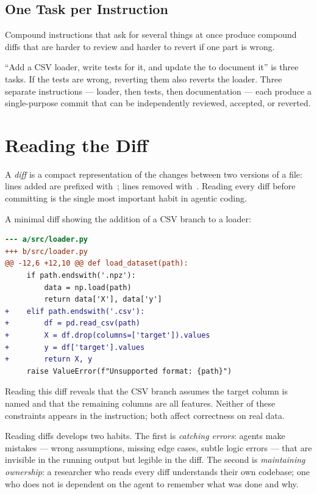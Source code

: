 \subsection{One Task per Instruction}

Compound instructions that ask for several things at once produce compound diffs that are harder to review and harder to revert if one part is wrong.

\begin{remark}
``Add a CSV loader, write tests for it, and update the  to document it'' is three tasks.
If the tests are wrong, reverting them also reverts the loader.
Three separate instructions — loader, then tests, then documentation — each produce a single-purpose commit that can be independently reviewed, accepted, or reverted.
\end{remark}

\section{Reading the Diff}
\label{section:ReadingDiff}

A \emph{diff} is a compact representation of the changes between two versions of a file: lines added are prefixed with~\code{+}; lines removed with~\code{-}.
Reading every diff before committing is the single most important habit in agentic coding.

\begin{example}
A minimal diff showing the addition of a CSV branch to a loader:
\begin{lstlisting}[language=diff]
--- a/src/loader.py
+++ b/src/loader.py
@@ -12,6 +12,10 @@ def load_dataset(path):
     if path.endswith('.npz'):
         data = np.load(path)
         return data['X'], data['y']
+    elif path.endswith('.csv'):
+        df = pd.read_csv(path)
+        X = df.drop(columns=['target']).values
+        y = df['target'].values
+        return X, y
     raise ValueError(f"Unsupported format: {path}")
\end{lstlisting}
Reading this diff reveals that the CSV branch assumes the target column is named  and that the remaining columns are all features.
Neither of these constraints appears in the instruction; both affect correctness on real data.
\end{example}

Reading diffs develops two habits.
The first is \emph{catching errors}: agents make mistakes — wrong assumptions, missing edge cases, subtle logic errors — that are invisible in the running output but legible in the diff.
The second is \emph{maintaining ownership}: a researcher who reads every diff understands their own codebase; one who does not is dependent on the agent to remember what was done and why.

